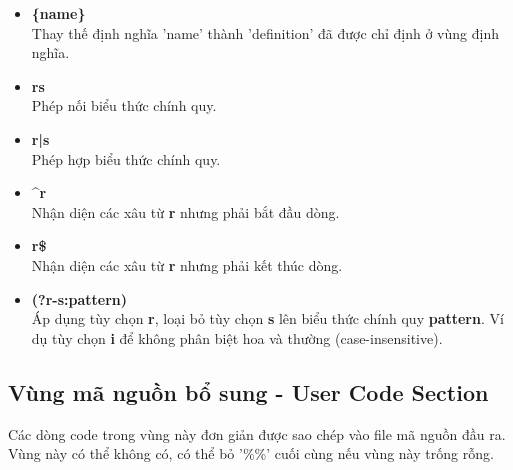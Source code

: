 \documentclass[../report.tex]{subfiles}
\begin{document}
\begin{itemize}
\item \textbf{\{name\}} \\
    Thay thế định nghĩa 'name' thành 'definition' đã được chỉ định ở vùng định nghĩa. 
\item \textbf{rs} \\
    Phép nối biểu thức chính quy. 
\item \textbf{r|s} \\
    Phép hợp biểu thức chính quy. 
\item \textbf{\textasciicircum r} \\
    Nhận diện các xâu từ \textbf{r} nhưng phải bắt đầu dòng. 
\item \textbf{r\$} \\
    Nhận diện các xâu từ \textbf{r} nhưng phải kết thúc dòng. 
\item \textbf{(?r-s:pattern)} \\
    Áp dụng tùy chọn \textbf{r}, loại bỏ tùy chọn \textbf{s} lên biểu thức chính quy \textbf{pattern}.
    Ví dụ tùy chọn \textbf{i} để không phân biệt hoa và thường (case-insensitive).
    
\end{itemize}

\subsection{Vùng mã nguồn bổ sung - User Code Section}
Các dòng code trong vùng này đơn giản được sao chép vào file mã nguồn đầu ra. 
Vùng này có thể không có, có thể bỏ '\%\%' cuối cùng nếu vùng này trống rỗng.  
\end{document}
